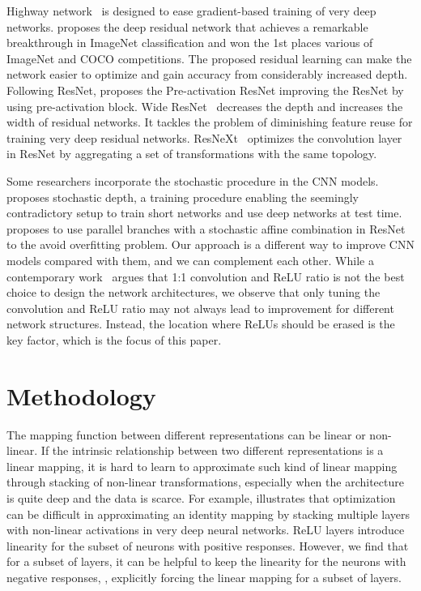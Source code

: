 \documentclass[10pt,twocolumn,letterpaper]{article}
\begin{document}
Highway network~\cite{srivastava2015training} is designed to ease gradient-based training of very deep networks.
\cite{he2016deep} proposes the deep residual network that achieves a remarkable breakthrough in ImageNet classification and won the 1st places various of ImageNet and COCO competitions. The proposed residual learning can make the network easier to optimize and gain accuracy from considerably increased depth.
Following ResNet, \cite{he2016identity} proposes the Pre-activation ResNet improving the ResNet by using pre-activation block.
Wide ResNet~\cite{zagoruyko2016wide} decreases the depth and increases the width of residual networks. It tackles the problem of diminishing feature reuse for training very deep residual networks.
ResNeXt~\cite{xie2017aggregated} optimizes the convolution layer in ResNet by aggregating a set of transformations with the same topology.


Some researchers incorporate the stochastic procedure in the CNN models.
\cite{huang2016deep} proposes stochastic depth, a training procedure enabling the seemingly contradictory setup to train short networks and use deep networks at test time.
\cite{gastaldi2017shake} proposes to use parallel branches with a stochastic affine combination in ResNet to the avoid overfitting problem.
Our approach is a different way to improve CNN models compared with them, and we can complement each other.
While a contemporary work~\cite{zhao2017training} argues that 1:1 convolution and ReLU ratio is not the best choice to design the network architectures, we observe that only tuning the convolution and ReLU ratio may not always lead to improvement for different network structures.
Instead, the location where ReLUs should be erased is the key factor, which is the focus of this paper.


\section{Methodology}

The mapping function between different representations can be linear or non-linear. If the intrinsic relationship between two different representations is a linear mapping, it is hard to learn to approximate such kind of linear mapping through stacking of non-linear transformations, especially when the architecture is quite deep and the data is scarce.
For example, \cite{he2016deep} illustrates that optimization can be difficult in approximating an identity mapping by stacking multiple layers with non-linear activations in very deep neural networks.
ReLU layers introduce linearity for the subset of neurons with positive responses.
However, we find that for a subset of layers, it can be helpful to keep the linearity for the neurons with negative responses, \ie, explicitly forcing the linear mapping for a subset of layers.
\end{document}
